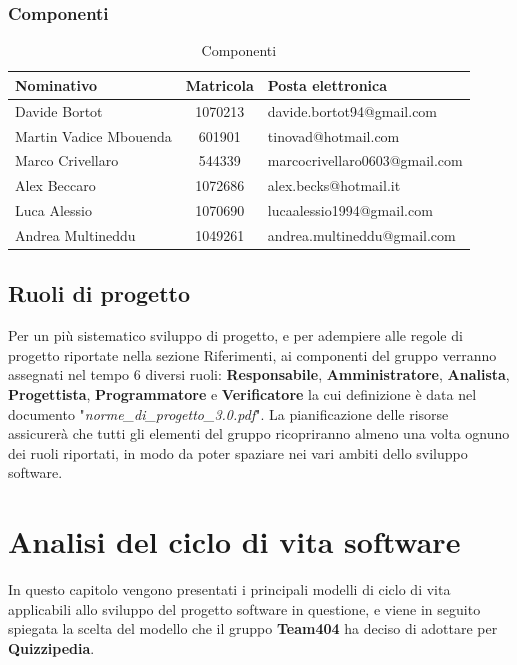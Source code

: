 \documentclass[a4paper,11pt]{article}
\begin{document}
	\subsubsection*{Componenti}
			\begin{table}[h!]			
				\begin{center}
				\begin{tabular}{l c l}
				\textbf{Nominativo} & \textbf{Matricola} & \textbf{Posta elettronica}\\
				\midrule
				Davide Bortot & 1070213 & davide.bortot94@gmail.com \\
				Martin Vadice Mbouenda & 601901 & tinovad@hotmail.com \\
				Marco Crivellaro & 544339 & marcocrivellaro0603@gmail.com \\
				Alex Beccaro & 1072686 & alex.becks@hotmail.it \\
				Luca Alessio & 1070690 & lucaalessio1994@gmail.com \\
				Andrea Multineddu & 1049261 & andrea.multineddu@gmail.com \\
				\midrule
				\end{tabular}
			\end{center}
			\caption{Componenti}
			\end{table}	

	\subsection{Ruoli di progetto}
		Per un più sistematico sviluppo di progetto, e per adempiere alle regole di progetto riportate nella sezione Riferimenti, ai componenti del gruppo verranno assegnati nel tempo 6 diversi ruoli: \textbf{Responsabile}, \textbf{Amministratore}, \textbf{Analista}, \textbf{Progettista}, \textbf{Programmatore} e \textbf{Verificatore} la cui definizione è data nel documento "\textit{norme\_di\_progetto\_3.0.pdf}". La pianificazione delle risorse assicurerà che tutti gli elementi del gruppo ricopriranno almeno una volta ognuno dei ruoli riportati, in modo da poter spaziare nei vari ambiti dello sviluppo software.
		
	\pagebreak	
	
	\newpage
	\section{Analisi del ciclo di vita software}	
	In questo capitolo vengono presentati i principali modelli di ciclo di vita applicabili allo sviluppo del progetto software in questione, e viene in seguito spiegata la scelta del modello che il gruppo \textbf{Team404} ha deciso di adottare per \textbf{Quizzipedia}.
\end{document}

